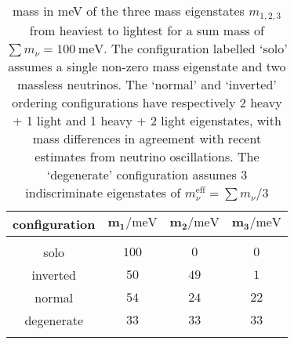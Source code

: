 \begin{table}
	\begin{center}
	\begin{small}
		\begin{tabular}{cccc}
			\textbf{configuration} & $\pmb{m_1 / \mathrm{meV}}$ & $\pmb{m_2 / \mathrm{meV}}$ & $\pmb{m_3 / \mathrm{meV}}$ \\[2pt]
			\hline \\[-10pt]
			solo & $100$ & $0$ & $0$ \\[2pt]
			inverted & $50$ & $49$ & $1$ \\[2pt]
			normal & $54$ & $24$ & $22$ \\[2pt]
			degenerate & $33$ & $33$ & $33$ \\[2pt]
			\hline \\[-10pt]
		\end{tabular}
	\end{small}
	\end{center}
	\caption{mass in meV of the three mass eigenstates $m_{1,2,3}$ from heaviest to lightest for a sum mass of $\sum m_\nu = 100 ~\mathrm{meV}$. The configuration labelled `solo' assumes a single non-zero mass eigenstate and two massless neutrinos. The `normal' and `inverted' ordering configurations have respectively 2 heavy + 1 light and 1 heavy + 2 light eigenstates, with mass differences in agreement with recent estimates from neutrino oscillations. The `degenerate' configuration assumes 3 indiscriminate eigenstates of $m_\nu^{\mathrm{eff}} = \sum m_\nu / 3$}
	\label{tab:ordering}
\end{table}

